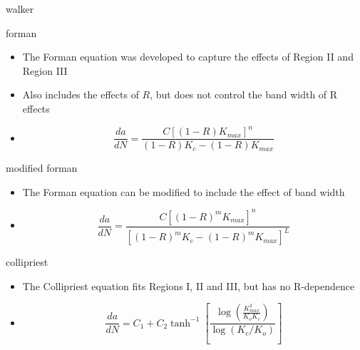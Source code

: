 \documentclass[10pt]{beamer}
\begin{document}
\begin{frame}{walker}
\end{frame}

\begin{frame}{forman}
	\begin{itemize}[<+->]
		\item The Forman equation was developed to capture the effects of Region II and Region III
		\item Also includes the effects of $R$, but does not control the band width of R effects
		\item[] \begin{equation}
		\frac{da}{dN} = \frac{C \left[(1-R)K_{max}\right]^n}{(1-R)K_c-(1-R)K_{max}}
		\end{equation}
	\end{itemize}
\end{frame}

\begin{frame}{modified forman}
	\begin{itemize}[<+->]
		\item The Forman equation can be modified to include the effect of band width
		\item[] \begin{equation}
		\frac{da}{dN} = \frac{C \left[(1-R)^m K_{max}\right]^n}{\left[(1-R)^mK_c-(1-R)^m K_{max}\right]^L}
		\end{equation}
	\end{itemize}
\end{frame}

\begin{frame}{collipriest}
	\begin{itemize}[<+->]
		\item The Collipriest equation fits Regions I, II and III, but has no R-dependence
		\item[] \begin{equation}
		\frac{da}{dN} = C_1 + C_2 \tanh^{-1} \left[\frac{\log \left(\frac{K_{max}^2}{K_oK_c}\right)}{\log (K_c/K_o)}\right]
		\end{equation}
	\end{itemize}
\end{frame}
\end{document}
